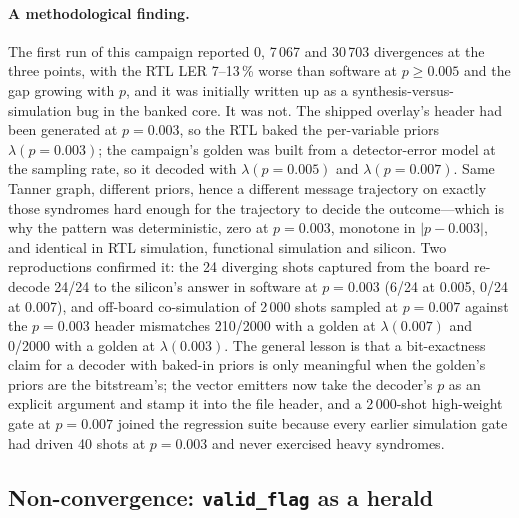 \paragraph{A methodological finding.}
The first run of this campaign reported 0, 7\,067 and 30\,703 divergences at
the three points, with the RTL LER 7--13\,\% worse than software at
$p \geq 0.005$ and the gap growing with $p$, and it was initially written up
as a synthesis-versus-simulation bug in the banked core. It was not. The
shipped overlay's header had been generated at $p = 0.003$, so the RTL baked
the per-variable priors $\lambda(p{=}0.003)$; the campaign's golden was built
from a detector-error model at the sampling rate, so it decoded with
$\lambda(p{=}0.005)$ and $\lambda(p{=}0.007)$. Same Tanner graph, different
priors, hence a different message trajectory on exactly those syndromes hard
enough for the trajectory to decide the outcome---which is why the pattern
was deterministic, zero at $p = 0.003$, monotone in $|p - 0.003|$, and
identical in RTL simulation, functional simulation and silicon. Two
reproductions confirmed it: the 24 diverging shots captured from the board
re-decode 24/24 to the silicon's answer in software at $p = 0.003$ (6/24 at
0.005, 0/24 at 0.007), and off-board co-simulation of 2\,000 shots sampled at
$p = 0.007$ against the $p = 0.003$ header mismatches 210/2000 with a golden
at $\lambda(0.007)$ and 0/2000 with a golden at $\lambda(0.003)$.
The general lesson is that a bit-exactness claim for a decoder with baked-in
priors is only meaningful when the golden's priors are the bitstream's; the
vector emitters now take the decoder's $p$ as an explicit argument and stamp
it into the file header, and a 2\,000-shot high-weight gate at $p = 0.007$
joined the regression suite because every earlier simulation gate had driven
40 shots at $p = 0.003$ and never exercised heavy syndromes.

\subsection*{Non-convergence: \texttt{valid\_flag} as a herald}

